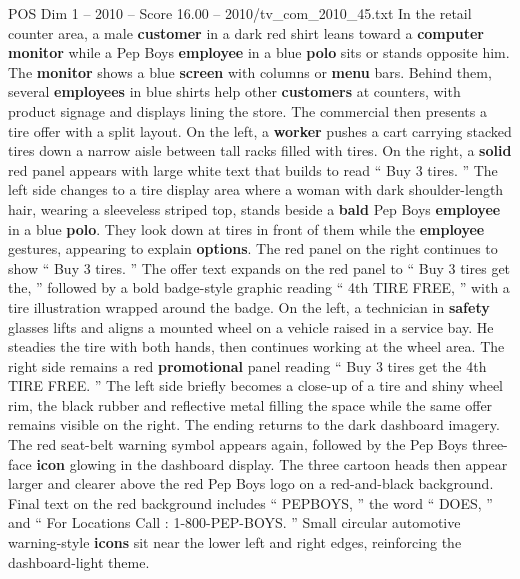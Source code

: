 \begin{textsample}{POS Dim 1 – 2010 – Score 16.00 – 2010/tv\_com\_2010\_45.txt}
In the retail counter area, a male \textbf{customer} in a dark red shirt leans toward a \textbf{computer} \textbf{monitor} while a Pep Boys \textbf{employee} in a blue \textbf{polo} sits or stands opposite him.
The \textbf{monitor} shows a blue \textbf{screen} with columns or \textbf{menu} bars.
Behind them, several \textbf{employees} in blue shirts help other \textbf{customers} at counters, with product signage and displays lining the store.
The commercial then presents a tire offer with a split layout.
On the left, a \textbf{worker} pushes a cart carrying stacked tires down a narrow aisle between tall racks filled with tires.
On the right, a \textbf{solid} red panel appears with large white text that builds to read “ Buy 3 tires. ” The left side changes to a tire display area where a woman with dark shoulder-length hair, wearing a sleeveless striped top, stands beside a \textbf{bald} Pep Boys \textbf{employee} in a blue \textbf{polo}.
They look down at tires in front of them while the \textbf{employee} gestures, appearing to explain \textbf{options}.
The red panel on the right continues to show “ Buy 3 tires. ” The offer text expands on the red panel to “ Buy 3 tires get the, ” followed by a bold badge-style graphic reading “ 4th TIRE FREE, ” with a tire illustration wrapped around the badge.
On the left, a technician in \textbf{safety} glasses lifts and aligns a mounted wheel on a vehicle raised in a service bay.
He steadies the tire with both hands, then continues working at the wheel area.
The right side remains a red \textbf{promotional} panel reading “ Buy 3 tires get the 4th TIRE FREE. ” The left side briefly becomes a close-up of a tire and shiny wheel rim, the black rubber and reflective metal filling the space while the same offer remains visible on the right.
The ending returns to the dark dashboard imagery.
The red seat-belt warning symbol appears again, followed by the Pep Boys three-face \textbf{icon} glowing in the dashboard display.
The three cartoon heads then appear larger and clearer above the red Pep Boys logo on a red-and-black background.
Final text on the red background includes “ PEPBOYS, ” the word “ DOES, ” and “ For Locations Call : 1-800-PEP-BOYS. ” Small circular automotive warning-style \textbf{icons} sit near the lower left and right edges, reinforcing the dashboard-light theme.

\end{textsample}

